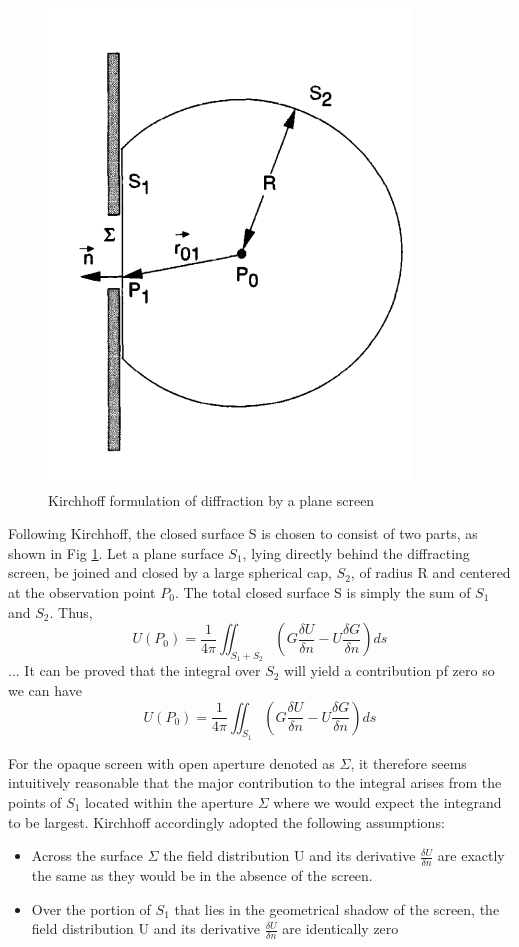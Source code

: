 \documentclass[../main.tex]{subfiles}
\begin{document}
	\begin{figure}[h!]
	  \centering
	  \includegraphics[scale=0.5]{../graphics/Wave_optics4.png}
	  \caption{Kirchhoff formulation of diffraction by a plane screen}
	  \label{fig:Kirchhoff}
	\end{figure}

	Following Kirchhoff, the closed surface S is chosen to consist of two parts, as shown in Fig \ref{fig:Kirchhoff}. Let a plane surface $S_1$, lying directly behind the diffracting screen, be joined and closed by a large spherical cap, $S_2$, of radius R and centered at the observation point $P_0$. The total closed surface S is simply the sum of $S_1$ and $S_2$. Thus, 
	\begin{equation}
	U(P_0)=\frac{1}{4\pi}\iint_{S_1+S_2}\left(G\frac{\delta U}{\delta n}-U\frac{\delta G}{\delta n}\right)ds
	\end{equation}
	...
	It can be proved that the integral over $S_2$ will yield a contribution pf zero so we can have 
	\begin{equation}
	U(P_0)=\frac{1}{4\pi}\iint_{S_1}\left(G\frac{\delta U}{\delta n}-U\frac{\delta G}{\delta n}\right)ds
	\end{equation}

	For the opaque screen with open aperture denoted as $\Sigma$, it therefore seems intuitively reasonable that the major contribution to the integral arises from the points of $S_1$ located within the aperture $\Sigma$ where we would expect the integrand to be largest. Kirchhoff accordingly adopted the following assumptions:
	\begin{itemize}
	\item Across the surface $\Sigma$ the field distribution U and its derivative $\frac{\delta U}{\delta n}$ are exactly the same as they would be in the absence of the screen.\\
	\item Over the portion of $S_1$ that lies in the geometrical shadow of the screen, the field distribution U and its derivative $\frac{\delta U}{\delta n}$ are identically zero
	\end{itemize}
\end{document}
